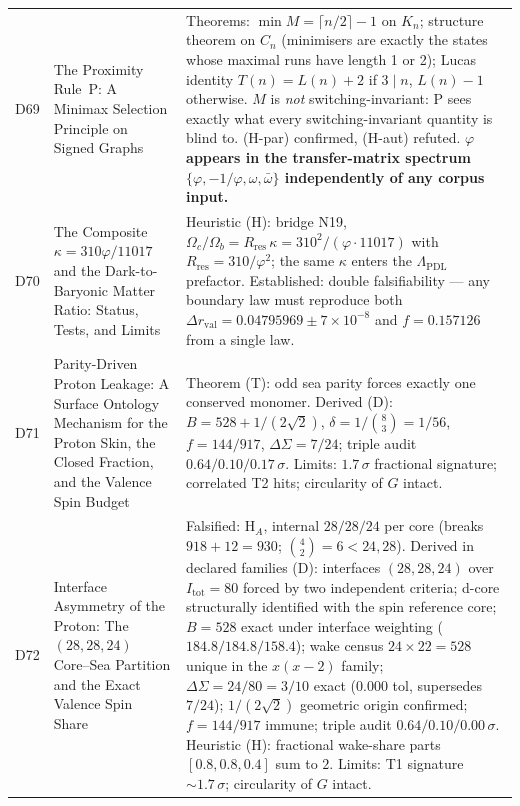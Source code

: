 \documentclass[11pt,a4paper]{article}
\theoremstyle{plain}
\theoremstyle{definition}
\theoremstyle{remark}
\begin{document}
\begin{longtable}{L{1.3cm}L{3.8cm}L{8.0cm}}
D69 & The Proximity Rule~P: A Minimax Selection Principle on Signed Graphs~\cite{D69} & \textcolor{proofblue}{Theorems}: $\min M=\lceil n/2\rceil-1$ on $K_n$; structure theorem on $C_n$ (minimisers are exactly the states whose maximal runs have length 1 or 2); Lucas identity $T(n)=L(n)+2$ if $3\mid n$, $L(n)-1$ otherwise. $M$ is \emph{not} switching-invariant: P sees exactly what every switching-invariant quantity is blind to. (H-par) confirmed, (H-aut) refuted. \textbf{$\varphi$ appears in the transfer-matrix spectrum $\{\varphi,-1/\varphi,\omega,\bar\omega\}$ independently of any corpus input.}\\[0.3em]
D70 & The Composite $\kappa=310\varphi/11017$ and the Dark-to-Baryonic Matter Ratio: Status, Tests, and Limits~\cite{D70} & \textcolor{hypothesisorange}{Heuristic (H)}: bridge N19, $\Omega_{c}/\Omega_{b}=R_{\mathrm{res}}\,\kappa=310^{2}/(\varphi\cdot11017)$ with $R_{\mathrm{res}}=310/\varphi^{2}$; the same $\kappa$ enters the $\Lambda_{\mathrm{PDL}}$ prefactor. \textcolor{proofblue}{Established}: double falsifiability --- any boundary law must reproduce both $\Delta r_{\mathrm{val}}=0.04795969\pm7\times10^{-8}$ and $f=0.157126$ from a single law.\\[0.3em]
D71 & Parity-Driven Proton Leakage: A Surface Ontology Mechanism for the Proton Skin, the Closed Fraction, and the Valence Spin Budget~\cite{D71} & \textcolor{proofblue}{Theorem (T)}: odd sea parity forces exactly one conserved monomer. \textcolor{proofblue}{Derived (D)}: $B=528+1/(2\sqrt{2})$, $\delta=1/\binom{8}{3}=1/56$, $f=144/917$, $\Delta\Sigma=7/24$; triple audit $0.64/0.10/0.17\,\sigma$. \textcolor{negativered}{Limits}: $1.7\,\sigma$ fractional signature; correlated T2 hits; circularity of $G$ intact.\\[0.3em]
D72 & Interface Asymmetry of the Proton: The $(28,28,24)$ Core--Sea Partition and the Exact Valence Spin Share~\cite{D72} & \textcolor{negativered}{Falsified}: H$_{A}$, internal $28/28/24$ per core (breaks $918+12=930$; $\binom{4}{2}=6<24,28$). \textcolor{proofblue}{Derived in declared families (D)}: interfaces $(28,28,24)$ over $I_{\mathrm{tot}}=80$ forced by two independent criteria; d-core structurally identified with the spin reference core; $B=528$ exact under interface weighting ($184.8/184.8/158.4$); wake census $24\times22=528$ unique in the $x(x-2)$ family; $\Delta\Sigma=24/80=3/10$ exact ($0.000$ tol, supersedes $7/24$); $1/(2\sqrt{2})$ geometric origin confirmed; $f=144/917$ immune; triple audit $0.64/0.10/0.00\,\sigma$. \textcolor{hypothesisorange}{Heuristic (H)}: fractional wake-share parts $[0.8,0.8,0.4]$ sum to $2$. \textcolor{negativered}{Limits}: T1 signature $\sim1.7\,\sigma$; circularity of $G$ intact.\\[0.3em]
\end{longtable}
\end{document}
